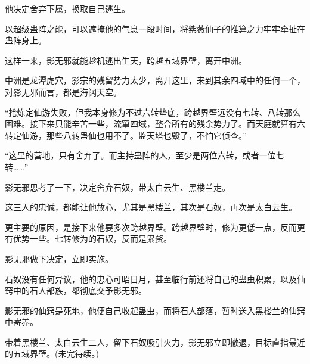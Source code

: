 \begin{this_body}
他决定舍弃下属，换取自己逃生。

以超级蛊阵之能，可以遮掩他的气息一段时间，将紫薇仙子的推算之力牢牢牵扯在蛊阵身上。

这样一来，影无邪就能趁机逃出生天，跨越五域界壁，离开中洲。

中洲是龙潭虎穴，影宗的残留势力太少，离开这里，来到其余四域中的任何一个，对影无邪而言，都是海阔天空。

“抢炼定仙游失败，但我本身修为不过六转垫底，跨越界壁远没有七转、八转那么困难。接下来只能辛苦一些，流窜四域，整合所有的残余势力了。而天庭就算有六转定仙游，那些八转蛊仙也用不了。监天塔也毁了，不怕它侦查。”

“这里的营地，只有舍弃了。而主持蛊阵的人，至少是两位六转，或者一位七转……”

影无邪思考了一下，决定舍弃石奴，带太白云生、黑楼兰走。

这三人的忠诚，都能让他放心，尤其是黑楼兰，其次是石奴，再次是太白云生。

更主要的原因，是接下来他要多次跨越界壁。跨越界壁时，修为更低一点，反而更有优势一些。七转修为的石奴，反而是累赘。

影无邪做下决定，立即实施。

石奴没有任何异议，他的忠心可昭日月，甚至临行前还将自己的蛊虫积累，以及仙窍中的石人部族，都彻底交予影无邪。

影无邪的仙窍是死地，他便自己收起蛊虫，而将石人部落，暂时送入黑楼兰的仙窍中寄养。

带着黑楼兰、太白云生二人，留下石奴吸引火力，影无邪立即撤退，目标直指最近的五域界壁。(未完待续。)

\end{this_body}

